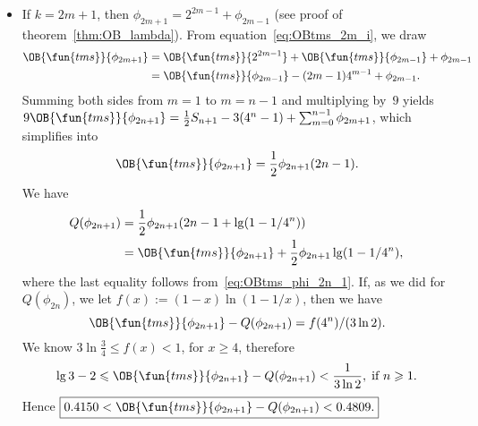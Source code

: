 \begin{itemize}
  \item If \(k=2m+1\), then \(\phi_{2m+1} = 2^{2m-1} + \phi_{2m-1}\)
    (see proof of theorem~\ref{thm:OB_lambda}). From
    equation~\eqref{eq:OBtms_2m_i}, we draw
    \begin{align*}
      \OB{\fun{tms}}{\phi_{2m+1}} &= \OB{\fun{tms}}{2^{2m-1}} +
      \OB{\fun{tms}}{\phi_{2m-1}} + \phi_{2m-1}\\
      &= \OB{\fun{tms}}{\phi_{2m-1}} - (2m-1)4^{m-1} + \phi_{2m-1}.
    \end{align*}
    Summing both sides from \(m=1\) to \(m=n-1\) and
    multiplying by~\(9\) yields \(9\OB{\fun{tms}}{\phi_{2n+1}} =
    \tfrac{1}{2}S_{n+1} - 3(4^n-1) + \sum_{m=0}^{n-1}\phi_{2m+1}\),
    which simplifies into
    \begin{equation}
      \OB{\fun{tms}}{\phi_{2n+1}} = \frac{1}{2}\phi_{2n+1}(2n - 1).
      \label{eq:OBtms_phi_2n_1}
    \end{equation}
    We have
    \begin{align*}
      Q(\phi_{2n+1}) &= \frac{1}{2}\phi_{2n+1}(2n-1 + \lg(1-1/4^n))\\
      &= \OB{\fun{tms}}{\phi_{2n+1}} + \frac{1}{2}\phi_{2n+1}\lg(1-1/4^n),
    \end{align*}
    where the last equality follows from~\eqref{eq:OBtms_phi_2n_1}.
    If, as we did for \(Q(\phi_{2n})\), we let \(f(x) :=
    (1-x)\ln(1-1/x)\), then we have
    \begin{equation*}
    \OB{\fun{tms}}{\phi_{2n+1}} - Q(\phi_{2n+1}) = f(4^n)/(3\ln 2).
    \end{equation*}
    We know \(3\ln\tfrac{3}{4} \leqslant f(x) < 1\), for \(x \geqslant
    4\), therefore
    \begin{equation*}
      \lg 3 - 2 \leqslant \OB{\fun{tms}}{\phi_{2n+1}} -
      Q(\phi_{2n+1}) < \frac{1}{3\ln 2},\; \text{if \(n \geqslant 1\)}.
    \end{equation*}
    Hence \(\boxed{0.4150 < \smash{\OB{\fun{tms}}{\phi_{2n+1}}} -
      Q(\phi_{2n+1}) < 0.4809.}\)


\end{itemize}
